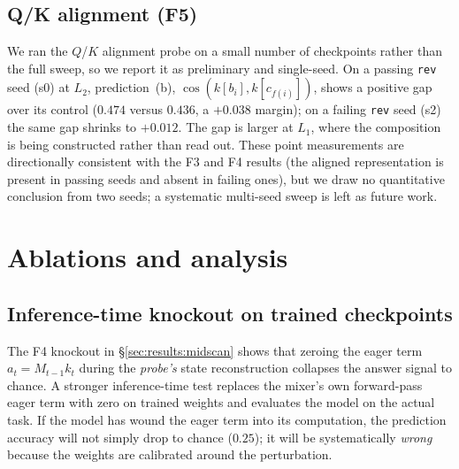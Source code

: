 \documentclass[11pt]{article}
\begin{document}
\subsection{Q/K alignment (F5)}
\label{sec:results:alignment}

We ran the $Q$/$K$ alignment probe on a small number of checkpoints
rather than the full sweep, so we report it as preliminary and
single-seed. On a passing \texttt{rev} seed (s0) at $L_2$,
prediction~(b), $\cos(k[b_i], k[c_{f(i)}])$, shows a positive gap over
its control ($0.474$ versus $0.436$, a $+0.038$ margin); on a failing
\texttt{rev} seed (s2) the same gap shrinks to $+0.012$. The gap is
larger at $L_1$, where the composition is being constructed rather than
read out. These point measurements are directionally consistent with the
F3 and F4 results (the aligned representation is present in passing seeds
and absent in failing ones), but we draw no quantitative conclusion from
two seeds; a systematic multi-seed sweep is left as future work.

\section{Ablations and analysis}
\label{sec:ablations}

\subsection{Inference-time knockout on trained checkpoints}
\label{sec:ablations:inference-ko}

The F4 knockout in \S\ref{sec:results:midscan} shows that zeroing the
eager term $a_t = M_{t-1} k_t$ during the \emph{probe's} state
reconstruction collapses the answer signal to chance. A stronger
inference-time test replaces the mixer's own forward-pass eager term
with zero on trained weights and evaluates the model on the actual
task. If the model has wound the eager term into its computation, the
prediction accuracy will not simply drop to chance ($0.25$); it will
be systematically \emph{wrong} because the weights are calibrated
around the perturbation.
\end{document}
